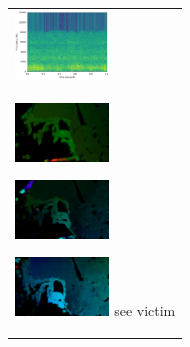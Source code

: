 \begin{enumerate}
\begin{end}
\begin{figure}[H]
\begin{tabular}{l}
\begin{minipage}{0.165\hsize}
\begin{center}
        \end{center}
      \end{minipage}
      \begin{minipage}{0.165\hsize}
        \begin{center}
          \includegraphics[clip, width=2.5cm]{./Figures/sound_seevictim.eps}
        \end{center}
      \end{minipage}
\\  %
      \begin{minipage}{0.165\hsize}
        \begin{center}
          \includegraphics[clip, width=2.5cm]{./Figures/optic_seevictim1.eps}
          \hspace{0.3cm} { }
        \end{center}
      \end{minipage}
      \begin{minipage}{0.165\hsize}
        \begin{center}
          \includegraphics[clip, width=2.5cm]{./Figures/optic_seevictim2.eps}
          \hspace{0.0cm} { }
        \end{center}
      \end{minipage}
      \begin{minipage}{0.165\hsize}
        \begin{center}
          \includegraphics[clip, width=2.5cm]{./Figures/optic_seevictim3.eps}
          \hspace{2.0cm} {see victim}
        \end{center}
      \end{minipage}

\end{tabular}
\end{figure}
\end{end}
\end{enumerate}
